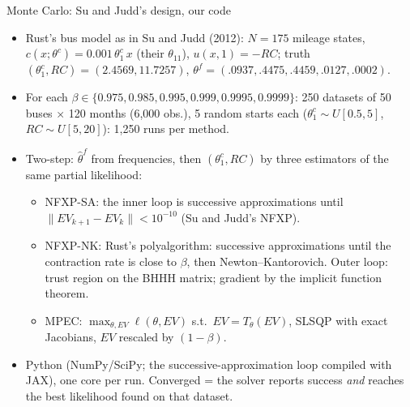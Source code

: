 \documentclass[aspectratio=169,11pt]{beamer}
\begin{document}
\begin{frame}{Monte Carlo: Su and Judd's design, our code}
\footnotesize
\begin{itemize}
\item Rust's bus model as in Su and Judd (2012): $N = 175$ mileage states, $c(x;\theta^c) = 0.001\,\theta^c_1\,x$ (their $\theta_{11}$), $u(x,1) = -RC$; truth $(\theta^c_1, RC) = (2.4569, 11.7257)$, $\theta^f = (.0937, .4475, .4459, .0127, .0002)$.
\item For each $\beta \in \{0.975, 0.985, 0.995, 0.999, 0.9995, 0.9999\}$: 250 datasets of 50 buses $\times$ 120 months (6{,}000 obs.), 5 random starts each ($\theta^c_1 \sim U[0.5,5]$, $RC \sim U[5,20]$): 1{,}250 runs per method.
\item Two-step: $\hat\theta^f$ from frequencies, then $(\theta^c_1, RC)$ by three estimators of the same partial likelihood:
\begin{itemize}
\item \alert{NFXP-SA}: the inner loop is successive approximations until $\|EV_{k+1} - EV_k\| < 10^{-10}$ (Su and Judd's NFXP).
\item \alert{NFXP-NK}: Rust's polyalgorithm: successive approximations until the contraction rate is close to $\beta$, then Newton--Kantorovich. Outer loop: trust region on the BHHH matrix; gradient by the implicit function theorem.
\item \alert{MPEC}: $\max_{\theta, EV} \ell(\theta, EV)$ s.t.\ $EV = T_\theta(EV)$, SLSQP with exact Jacobians, $EV$ rescaled by $(1-\beta)$.
\end{itemize}
\item Python (NumPy/SciPy; the successive-approximation loop compiled with JAX), one core per run. \alert{Converged} = the solver reports success \emph{and} reaches the best likelihood found on that dataset.
\end{itemize}
\end{frame}
\end{document}
